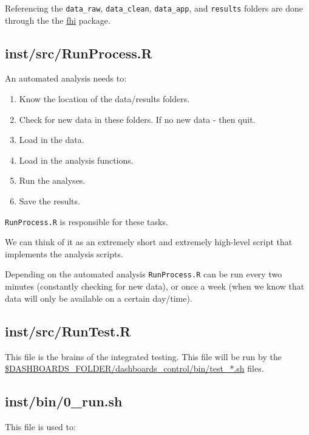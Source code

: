 \documentclass[12pt,]{article}
\providecommand{\tightlist}{%
  \setlength{\itemsep}{0pt}\setlength{\parskip}{0pt}}
\begin{document}
Referencing the \texttt{data\_raw}, \texttt{data\_clean},
\texttt{data\_app}, and \texttt{results} folders are done through the
the
\href{https://folkehelseinstituttet.github.io/fhi/articles/dashboardbasics.html}{fhi}
package.

\hypertarget{RunProcess}{\subsection{inst/src/RunProcess.R}\label{RunProcess}}

An automated analysis needs to:

\begin{enumerate}
\def\labelenumi{\arabic{enumi}.}
\tightlist
\item
  Know the location of the data/results folders.
\item
  Check for new data in these folders. If no new data - then quit.
\item
  Load in the data.
\item
  Load in the analysis functions.
\item
  Run the analyses.
\item
  Save the results.
\end{enumerate}

\texttt{RunProcess.R} is responsible for these tasks.

We can think of it as an extremely short and extremely high-level script
that implements the analysis scripts.

Depending on the automated analysis \texttt{RunProcess.R} can be run
every two minutes (constantly checking for new data), or once a week
(when we know that data will only be available on a certain day/time).

\subsection{inst/src/RunTest.R}\label{instsrcruntest.r}

This file is the brains of the integrated testing. This file will be run
by the
\protect\hyperlink{test_noispiah}{\$DASHBOARDS\_FOLDER/dashboards\_control/bin/test\_*.sh}
files.

\hypertarget{Runsh}{\subsection{inst/bin/0\_run.sh}\label{Runsh}}

This file is used to:
\end{document}
